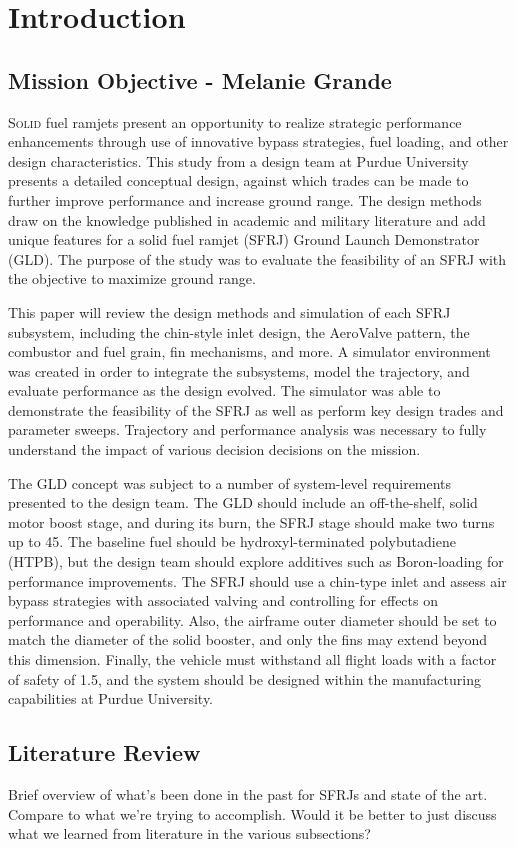 \section{Introduction}

\subsection{Mission Objective - Melanie Grande}
\lettrine{S}{olid} fuel ramjets present an opportunity to realize strategic performance enhancements through use of innovative bypass strategies, fuel loading, and other design characteristics. This study from a design team at Purdue University presents a detailed conceptual design, against which trades can be made to further improve performance and increase ground range. The design methods draw on the knowledge published in academic and military literature and add unique features for a solid fuel ramjet (SFRJ) Ground Launch Demonstrator (GLD). The purpose of the study was to evaluate the feasibility of an SFRJ with the objective to maximize ground range. 

This paper will review the design methods and simulation of each SFRJ subsystem, including the chin-style inlet design, the AeroValve pattern, the combustor and fuel grain, fin mechanisms, and more. A simulator environment was created in order to integrate the subsystems, model the trajectory, and evaluate performance as the design evolved. The simulator was able to demonstrate the feasibility of the SFRJ as well as perform key design trades and parameter sweeps. Trajectory and performance analysis was necessary to fully understand the impact of various decision decisions on the mission.

The GLD concept was subject to a number of system-level requirements presented to the design team. The GLD should include an off-the-shelf, solid motor boost stage, and during its burn, the SFRJ stage should make two turns up to 45\textdegree. The baseline fuel should be hydroxyl-terminated polybutadiene (HTPB), but the design team should explore additives such as Boron-loading for performance improvements. The SFRJ should use a chin-type inlet and assess air bypass strategies with associated valving and controlling for effects on performance and operability. Also, the airframe outer diameter should be set to match the diameter of the solid booster, and only the fins may extend beyond this dimension. Finally, the vehicle must withstand all flight loads with a factor of safety of 1.5, and the system should be designed within the manufacturing capabilities at Purdue University.

\subsection{Literature Review}
Brief overview of what's been done in the past for SFRJs and state of the art. Compare to what we're trying to accomplish.
\color{red}Would it be better to just discuss what we learned from literature in the various subsections?\color{black}